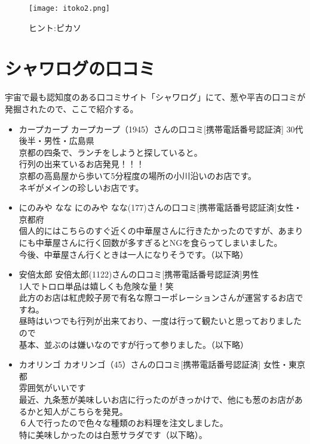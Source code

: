\begin{figure}[H]
\centering
\texttt{[image: itoko2.png]}
\caption{ヒント:ピカソ}
\label{itoko2}
\end{figure}

\section{シャワログの口コミ}
宇宙で最も認知度のある口コミサイト「シャワログ」にて、葱や平吉の口コミが発掘されたので、ここで紹介する。

\begin{itemize}
\item カープカープ カープカープ（1945）さんの口コミ[携帯電話番号認証済] 30代後半・男性・広島県\\
京都の四条で、ランチをしようと探していると。\\
行列の出来ているお店発見！！！\\
京都の高島屋から歩いて5分程度の場所の小川沿いのお店です。\\
ネギがメインの珍しいお店です。\\

\item にのみや なな にのみや なな(177)さんの口コミ[携帯電話番号認証済]女性・京都府\\
個人的にはこちらのすぐ近くの中華屋さんに行きたかったのですが、あまりにも中華屋さんに行く回数が多すぎるとNGを食らってしまいました。\\
今後、中華屋さん行くときは一人になりそうです。（以下略）\\

\item 安倍太郎 安倍太郎(1122)さんの口コミ[携帯電話番号認証済]男性\\
1人でトロロ単品は嬉しくも危険な量！笑\\
此方のお店は紅虎餃子房で有名な際コーポレーションさんが運営するお店ですね。\\
昼時はいつでも行列が出来ており、一度は行って観たいと思っておりましたので\\
基本、並ぶのは嫌いなのですが行って参りました。（以下略）\\

\item カオリンゴ カオリンゴ（45）さんの口コミ[携帯電話番号認証済]
女性・東京都\\
雰囲気がいいです\\

最近、九条葱が美味しいお店に行ったのがきっかけで、他にも葱のお店があるかと知人がこちらを発見。\\
６人で行ったので色々な種類のお料理を注文しました。\\
特に美味しかったのは白葱サラダです（以下略）。\\
\end{itemize}

